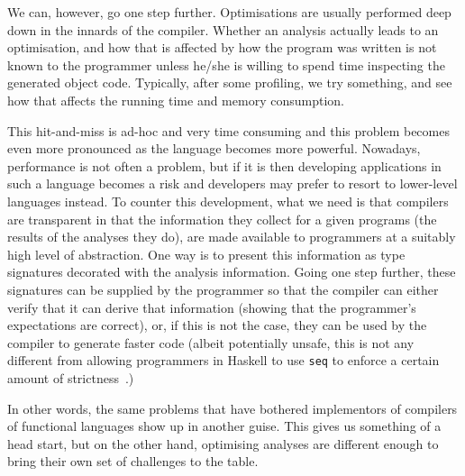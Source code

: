 \documentclass[sigplan,10pt,noacm]{acmart}
\begin{document}
We can, however, go one step further. Optimisations are usually performed
deep down in the innards of the compiler. Whether an analysis actually
leads to an optimisation, and how that is affected by how the program
was written is not known to the programmer unless he/she is willing
to spend time inspecting the generated object code. Typically, 
after some profiling, we try something, and see how that affects 
the running time and memory consumption.

This hit-and-miss is ad-hoc and very time consuming and this problem
becomes even more pronounced as the language becomes more powerful.
Nowadays, performance is not often a problem, but if it is then developing
applications in such a language becomes a risk and developers may prefer
to resort to lower-level languages instead. To counter this development,
what we need is that compilers are transparent in that the 
information they collect for a given programs (the results of the 
analyses they do), are made available to programmers at a suitably
high level of abstraction. One way is to present this information
as type signatures decorated with the analysis information. Going one step
further, these signatures can be supplied by the programmer so that
the compiler can either verify that it can derive that information (showing
that the programmer's expectations are correct), or, if this is not the case,
they can be used by the compiler to generate faster code 
(albeit potentially unsafe, this
is not any different from allowing programmers in Haskell to use
\texttt{seq} to enforce a certain amount of strictness~\cite{holdermansmaking}.)

In other words, the same problems that have bothered implementors of compilers
of functional languages show up in another guise. This gives us something
of a head start, but on the other hand, optimising analyses are different
enough to bring their own set of challenges to the table.
\end{document}
